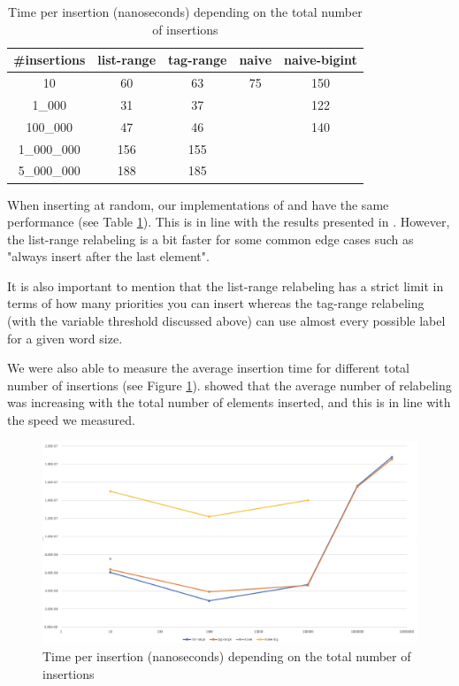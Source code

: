 \documentclass[12pt]{article}
\begin{document}
\begin{table}[h!]
  \begin{center}
    \begin{tabular}{|c | c c c c|}
      \hline
      \#insertions & list-range & tag-range & naive & naive-bigint \\ [0.5ex]
      \hline
      10           & 60         & 63        & 75    & 150          \\
      \hline
      1\_000       & 31         & 37        &       & 122          \\
      \hline
      100\_000     & 47         & 46        &       & 140          \\
      \hline
      1\_000\_000  & 156        & 155       &       &              \\
      \hline
      5\_000\_000  & 188        & 185       &       &              \\
      \hline
    \end{tabular}

    \caption{Time per insertion (nanoseconds) depending on the total number of insertions}
    \label{table:insert}

  \end{center}
\end{table}

When inserting at random, our implementations of \cite{10.1145/28395.28434} and \cite{10.5555/647912.740822} have the same performance (see Table \ref{table:insert}). This is in line with the results presented in \cite{10.5555/647912.740822}. However, the list-range relabeling is a bit faster for some common edge cases such as "always insert after the last element".

It is also important to mention that the list-range relabeling has a strict limit in terms of how many priorities you can insert whereas the tag-range relabeling (with the variable threshold discussed above) can use almost every possible label for a given word size.

We were also able to measure the average insertion time for different total number of insertions (see Figure \ref{graph:insert}). \cite{10.5555/647912.740822} showed that the average number of relabeling was increasing with the total number of elements inserted, and this is in line with the speed we measured.

\begin{figure}[h!]
  \includegraphics[width=450px, keepaspectratio]{./insert.png}
  \caption{Time per insertion (nanoseconds) depending on the total number of insertions}
  \label{graph:insert}
\end{figure}
\end{document}
